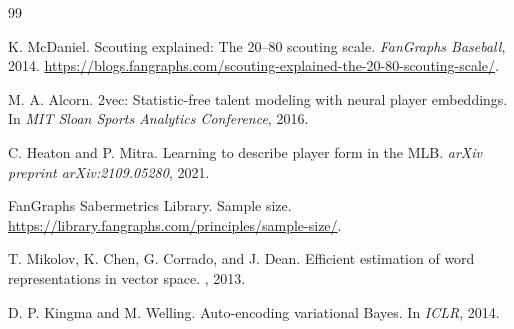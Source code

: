 \documentclass[10pt,twocolumn,letterpaper]{article}
\begin{document}
\begin{thebibliography}{99}

K. McDaniel.
\newblock Scouting explained: The 20--80 scouting scale.
\newblock \emph{FanGraphs Baseball}, 2014. \url{https://blogs.fangraphs.com/scouting-explained-the-20-80-scouting-scale/}.

M. A. Alcorn.
\newblock 2vec: Statistic-free talent modeling with neural player embeddings.
\newblock In \emph{MIT Sloan Sports Analytics Conference}, 2016.

C. Heaton and P. Mitra.
\newblock Learning to describe player form in the MLB.
\newblock \emph{arXiv preprint arXiv:2109.05280}, 2021.

FanGraphs Sabermetrics Library.
\newblock Sample size.
\newblock \url{https://library.fangraphs.com/principles/sample-size/}.

T. Mikolov, K. Chen, G. Corrado, and J. Dean.
\newblock Efficient estimation of word representations in vector space.
, 2013.

D. P. Kingma and M. Welling.
\newblock Auto-encoding variational Bayes.
\newblock In {\em ICLR}, 2014.

\end{thebibliography}
\end{document}
